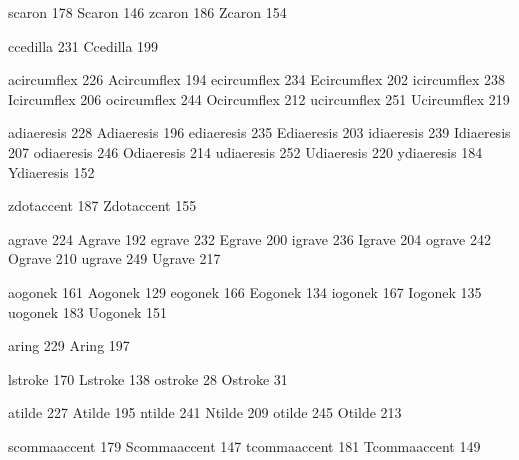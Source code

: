  scaron           178
 Scaron           146
 zcaron           186
 Zcaron           154

 ccedilla         231
 Ccedilla         199

 acircumflex      226
 Acircumflex      194
 ecircumflex      234
 Ecircumflex      202
 icircumflex      238
 Icircumflex      206
 ocircumflex      244
 Ocircumflex      212
 ucircumflex      251
 Ucircumflex      219

 adiaeresis       228
 Adiaeresis       196
 ediaeresis       235
 Ediaeresis       203
 idiaeresis       239
 Idiaeresis       207
 odiaeresis       246
 Odiaeresis       214
 udiaeresis       252
 Udiaeresis       220
 ydiaeresis       184
 Ydiaeresis       152

 zdotaccent       187
 Zdotaccent       155

 agrave           224
 Agrave           192
 egrave           232
 Egrave           200
 igrave           236
 Igrave           204
 ograve           242
 Ograve           210
 ugrave           249
 Ugrave           217

 aogonek          161
 Aogonek          129
 eogonek          166
 Eogonek          134
 iogonek          167
 Iogonek          135
 uogonek          183
 Uogonek          151

 aring            229
 Aring            197

 lstroke          170
 Lstroke          138
 ostroke           28
 Ostroke           31

 atilde           227
 Atilde           195
 ntilde           241
 Ntilde           209
 otilde           245
 Otilde           213

 scommaaccent     179
 Scommaaccent     147
 tcommaaccent     181
 Tcommaaccent     149

\stopencoding

\endinput